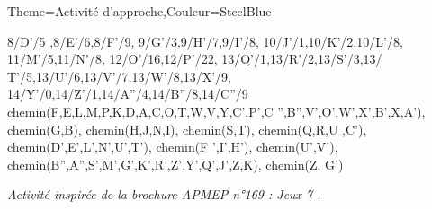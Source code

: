 \begin{Maquette}[Cours]{Theme={Activité d'approche},Couleur={SteelBlue}}
\begin{AActivite}
\begin{minipage}{10cm}
{                  8/D'/5 ,8/E'/6,8/F'/9,
                  9/G'/3,9/H'/7,9/I'/8,
                  10/J'/1,10/K'/2,10/L'/8,
                  11/M'/5,11/N'/8,
                  12/O'/16,12/P'/22,
                  13/Q'/1,13/R'/2,13/S'/3,13/ T'/5,13/U'/6,13/V'/7,13/W'/8,13/X'/9,
                  14/Y'/0,14/Z'/1,14/A''/4,14/B''/8,14/C''/9}
                  {chemin(F,E,L,M,P,K,D,A,C,O,T,W,V,Y,C',P',C '',B'',V',O',W',X',B',X,A'),
                  chemin(G,B),
                  chemin(H,J,N,I),
                  chemin(S,T),
                  chemin(Q,R,U ,C'),
                  chemin(D',E',L',N',U',T'),
                  chemin(F ',I',H'),
                  chemin(U',V'),
                  chemin(B'',A'',S',M',G',K',R',Z',Y',Q',J',Z,K),
                  chemin(Z, G')}
            \end{minipage} \par \vspace*{-8mm}

   \end{AActivite}

   \vfill\hfill{\it\footnotesize Activité inspirée de la brochure APMEP n°169 : \og Jeux 7 \fg.}

\end{Maquette}


